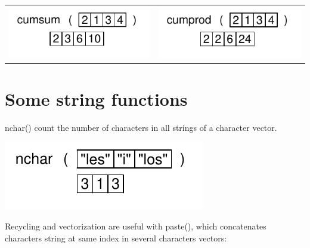 \documentclass[pdflatex]{article}
\begin{document}
\begin{tabular}{cc}
\includegraphics{cumsum} & \includegraphics{cumprod}
\end{tabular}


\section{Some string functions}

nchar() count the number of characters in all strings of a character vector.

\includegraphics{nchar}

Recycling and vectorization are useful with paste(), which concatenates characters string at same index in several characters vectors:
\end{document}
